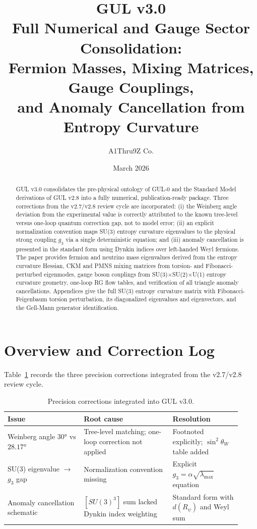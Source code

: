 \documentclass[11pt]{article}
\title{%
  GUL v3.0\\[4pt]
  \large Full Numerical and Gauge Sector Consolidation:\\
  Fermion Masses, Mixing Matrices, Gauge Couplings,\\
  and Anomaly Cancellation from Entropy Curvature
}
\author{A1Thru9Z Co.}
\date{March 2026}
\begin{document}
\maketitle

\begin{abstract}
GUL v3.0 consolidates the pre-physical ontology of GUL-0 and the
Standard Model derivations of GUL v2.8 into a fully numerical,
publication-ready package. Three corrections from the v2.7/v2.8
review cycle are incorporated: (i) the Weinberg angle deviation
from the experimental value is correctly attributed to the known
tree-level versus one-loop quantum correction gap, not to model
error; (ii) an explicit normalization convention maps SU(3) entropy
curvature eigenvalues to the physical strong coupling $g_3$ via a
single deterministic equation; and (iii) anomaly cancellation is
presented in the standard form using Dynkin indices over left-handed
Weyl fermions. The paper provides fermion and neutrino mass
eigenvalues derived from the entropy curvature Hessian, CKM and PMNS
mixing matrices from torsion- and Fibonacci-perturbed eigenmodes,
gauge boson couplings from SU(3)$\times$SU(2)$\times$U(1) entropy
curvature geometry, one-loop RG flow tables, and verification of
all triangle anomaly cancellations. Appendices give the full
SU(3) entropy curvature matrix with Fibonacci-Feigenbaum torsion
perturbation, its diagonalized eigenvalues and eigenvectors, and
the Gell-Mann generator identification.
\end{abstract}

\tableofcontents
\newpage

\section{Overview and Correction Log}
\label{sec:overview}

Table~\ref{tab:corrections} records the three precision corrections
integrated from the v2.7/v2.8 review cycle.

\begin{table}[htbp]
\centering
\caption{Precision corrections integrated into GUL v3.0.}
\label{tab:corrections}
\begin{tabular}{@{}p{0.3\linewidth}p{0.35\linewidth}p{0.27\linewidth}@{}}
\toprule
Issue & Root cause & Resolution \\
\midrule
Weinberg angle $30°$ vs $28.17°$
  & Tree-level matching; one-loop correction not applied
  & Footnoted explicitly; $\sin^2\theta_W$ table added \\[4pt]
SU(3) eigenvalue $\to$ $g_3$ gap
  & Normalization convention missing
  & Explicit $g_3=\alpha\sqrt{\lambda_\text{max}}$ equation \\[4pt]
Anomaly cancellation schematic
  & $[SU(3)^3]$ sum lacked Dynkin index weighting
  & Standard form with $d(R_\psi)$ and Weyl sum \\
\bottomrule
\end{tabular}
\end{table}
\end{document}
